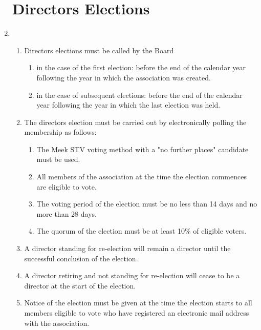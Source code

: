 \begin{enumerate}
\section{Directors Elections}
\item
  \begin{enumerate}
    \item Directors elections must be called by the Board
      \begin{enumerate}
        \item in the case of the first election: before the end of the calendar year following
                the year in which the association was created.
        \item in the case of subsequent elections: before the end of the calendar year following
                the year in which the last election was held.
      \end{enumerate}
    \item
      The directors election must be carried out by electronically polling the membership as follows:
      \begin{enumerate}
        \item The Meek STV voting method with a "no further places" candidate must be used.
        \item All members of the association at the time the election commences are eligible to vote.
        \item The voting period of the election must be no less than 14 days and no more than 28 days.
        \item The quorum of the election must be at least 10\% of eligible voters.
      \end{enumerate}
    \item A director standing for re-election will remain a director until the successful conclusion
          of the election.
    \item A director retiring and not standing for re-election will cease to be a director at the
          start of the election.
    \item Notice of the election must be given at the time the election starts to all members eligible
          to vote who have registered an electronic mail address with the association.
   \end{enumerate}


\end{enumerate}
